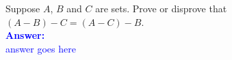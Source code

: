 \item{}
Suppose $A$, $B$ and $C$ are sets. Prove or disprove that $(A-B)-C=(A-C)-B$.
\\[12pt]
\ifanswers
\textcolor{blue}{
\textbf{Answer:}\\[6pt]
answer goes here
}
\newpage
\fi
